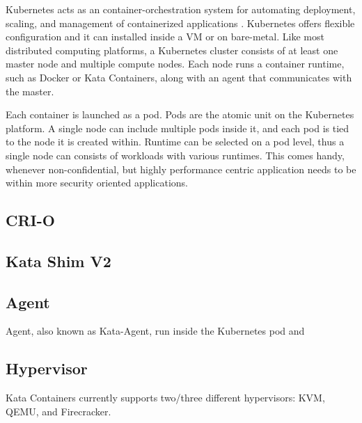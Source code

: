 Kubernetes acts as an container-orchestration system for automating deployment, scaling, and management of containerized applications \cite{Kubernetes}. Kubernetes offers flexible configuration and it can installed inside a VM or on bare-metal. Like most distributed computing platforms, a Kubernetes cluster consists of at least one master node and multiple compute nodes. Each node runs a container runtime, such as Docker or Kata Containers, along with an agent that communicates with the master.

Each container is launched as a pod. Pods are the atomic unit on the Kubernetes platform. A single node can include multiple pods inside it, and each pod is tied to the node it is created within. Runtime can be selected on a pod level, thus a single node can consists of workloads with various runtimes. This comes handy, whenever non-confidential, but highly performance centric application needs to be within more security oriented applications.

\subsection{CRI-O}


\subsection{Kata Shim V2}

\subsection{Agent}

Agent, also known as Kata-Agent, run inside the Kubernetes pod and

\subsection{Hypervisor}

Kata Containers currently supports two/three different hypervisors: KVM, QEMU, and Firecracker.




  



